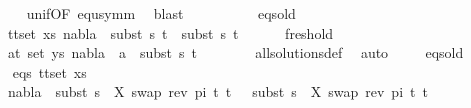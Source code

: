 \begin{isabellebody}
\ \ \ \ \ \isamarkupfalse%
\ unif{\isacharunderscore}{\kern0pt}{}{\isacharbrackleft}{\kern0pt}OF\ equ{\isacharunderscore}{\kern0pt}symm{\isacharbrackright}{\kern0pt}\ \isamarkupfalse%
\ blast\isanewline
\isanewline
\ \ \ \isamarkupfalse%
\ {}\isanewline
\ \ \ \isamarkupfalse%
\ eqs{\isacharunderscore}{\kern0pt}old{\isacharcolon}{\kern0pt}\isanewline
\ \ \ \ {\isachardoublequoteopen}{\isasymforall}{\isacharparenleft}{\kern0pt}t{}{\isacharcomma}{\kern0pt}t{}{\isacharparenright}{\kern0pt}{\isasymin}set\ xs{\isachardot}{\kern0pt}\ nabla{}\ {\isasymturnstile}\ subst\ s{}\ t{}\ {\isasymapprox}\ subst\ s{}\ t{}{\isachardoublequoteclose}\isanewline
\ \ \ \ \ \ fresh{\isacharunderscore}{\kern0pt}old{\isacharcolon}{\kern0pt}\isanewline
\ \ \ \ {\isachardoublequoteopen}{\isasymforall}{\isacharparenleft}{\kern0pt}a{\isacharcomma}{\kern0pt}t{\isacharparenright}{\kern0pt}{\isasymin}\ set\ ys{\isachardot}{\kern0pt}\ nabla{}\ {\isasymturnstile}\ a\ {\isasymsharp}\ subst\ s{}\ t{\isachardoublequoteclose}\isanewline
\ \ \ \ \ \ \isamarkupfalse%
\ all{\isacharunderscore}{\kern0pt}solutions{\isacharunderscore}{\kern0pt}def\ \isamarkupfalse%
\ auto\isanewline
\isanewline
\ \ \ \isamarkupfalse%
\ eqs{\isacharunderscore}{\kern0pt}old\ \isanewline
\ \ \ \isamarkupfalse%
\ eqs{\isacharcolon}{\kern0pt}\ {\isachardoublequoteopen}{\isasymforall}{\isacharparenleft}{\kern0pt}t{}{\isacharcomma}{\kern0pt}t{}{\isacharparenright}{\kern0pt}{\isasymin}set\ xs{\isachardot}{\kern0pt}\ \isanewline
\ \ \ \ nabla{}\ {\isasymturnstile}\ subst\ {\isacharparenleft}{\kern0pt}s{}\ {\isasymbullet}\ {\isacharbrackleft}{\kern0pt}{\isacharparenleft}{\kern0pt}X{\isacharcomma}{\kern0pt}\ swap\ {\isacharparenleft}{\kern0pt}rev\ pi{\isacharparenright}{\kern0pt}\ t{\isacharprime}{\kern0pt}{\isacharparenright}{\kern0pt}{\isacharbrackright}{\kern0pt}{\isacharparenright}{\kern0pt}\ t{}\ {\isasymapprox}\ \ subst\ {\isacharparenleft}{\kern0pt}s{}\ {\isasymbullet}\ {\isacharbrackleft}{\kern0pt}{\isacharparenleft}{\kern0pt}X{\isacharcomma}{\kern0pt}\ swap\ {\isacharparenleft}{\kern0pt}rev\ pi{\isacharparenright}{\kern0pt}\ t{\isacharprime}{\kern0pt}{\isacharparenright}{\kern0pt}{\isacharbrackright}{\kern0pt}{\isacharparenright}{\kern0pt}\ t{}{\isachardoublequoteclose}\isanewline

\end{isabellebody}
